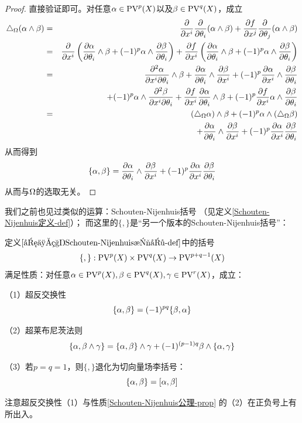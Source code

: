 \begin{proof}
直接验证即可。对任意$\alpha\in\operatorname{PV}^p(X)$以及$\beta\in\operatorname{PV}^q(X)$，成立
\begin{eqnarray*}
     \triangle_\Omega(\alpha\wedge\beta)
&=&
     \frac{\partial } {\partial x^i}\frac{\partial } {\partial \theta_i}
     (\alpha\wedge\beta)
    +\frac{\partial f} {\partial x^j}\frac{\partial } {\partial \theta_j}
     (\alpha\wedge\beta)\\
&=&
     \frac{\partial } {\partial x^i}
     \left(
       \frac{\partial \alpha} {\partial \theta_i}
       \wedge\beta
      +(-1)^p\alpha\wedge\frac{\partial \beta} {\partial \theta_i}
     \right)
    +\frac{\partial f} {\partial x^i}
     \left(
       \frac{\partial \alpha} {\partial \theta_i}\wedge\beta
      +(-1)^p\alpha\wedge\frac{\partial \beta} {\partial \theta_i}
     \right)\\
&=&
     \frac{\partial^2{\alpha}} {\partial{x^i}\partial{\theta_i}}\wedge\beta
    +\frac{\partial \alpha} {\partial \theta_i}\wedge\frac{\partial \beta} {\partial x^i}
    +(-1)^p\frac{\partial \alpha} {\partial x^i}\wedge\frac{\partial \beta} {\partial \theta_i}\\
& &
    +(-1)^p\alpha\wedge\frac{\partial^2{\beta}} {\partial{x^i}\partial{\theta_i}}
    +\frac{\partial f} {\partial x^i}\frac{\partial \alpha} {\partial \theta_i}\wedge\beta
    +(-1)^p\frac{\partial f} {\partial x^i}\alpha\wedge\frac{\partial \beta} {\partial \theta_i}\\
&=&
     (\triangle_\Omega\alpha)\wedge\beta
    +(-1)^p\alpha\wedge(\triangle_\Omega\beta)\\
& &
    +\frac{\partial \alpha} {\partial \theta_i}\wedge\frac{\partial \beta} {\partial x^i}
    +(-1)^p\frac{\partial \alpha} {\partial x^i}\frac{\partial \beta} {\partial \theta_i}
\end{eqnarray*}
从而得到
$$
  \{\alpha,\beta\}
=
  \frac{\partial \alpha} {\partial \theta_i}\wedge\frac{\partial \beta} {\partial x^i}
 +(-1)^p\frac{\partial \alpha} {\partial x^i}\frac{\partial \beta} {\partial \theta_i}
$$
从而与$\Omega$的选取无关。
\end{proof}

我们之前也见过类似的运算：Schouten-Nijenhuis括号
（见定义\ref{Schouten-Nijenhuis定义-def}）；
而这里的$\{,\}$是“另一个版本的Schouten-Nijenhuis括号”：

\begin{lemma}定义$\ref{另一种Schouten-Nijenhuis括号-def}$中的括号
$$\{,\}:\operatorname{PV}^p(X)\times\operatorname{PV}^q(X)\to\operatorname{PV}^{p+q-1}(X)$$
满足性质：对任意$\alpha\in\operatorname{PV}^p(X),\beta\in\operatorname{PV}^q(X),\gamma\in\operatorname{PV}^r(X)$，成立：

（1）超反交换性
$$\{\alpha,\beta\}=(-1)^{pq}\{\beta,\alpha\}$$

（2）超莱布尼茨法则
$$\{\alpha,\beta\wedge\gamma\}
=\{\alpha,\beta\}\wedge\gamma
+(-1)^{(p-1)q}\beta\wedge\{\alpha,\gamma\}$$

（3）若$p=q=1$，则$\{,\}$退化为切向量场李括号：
$$\{\alpha,\beta\}=[\alpha,\beta]$$
\end{lemma}

注意超反交换性（1）与性质\ref{Schouten-Nijenhuis公理-prop}
的（2）在正负号上有所出入。

